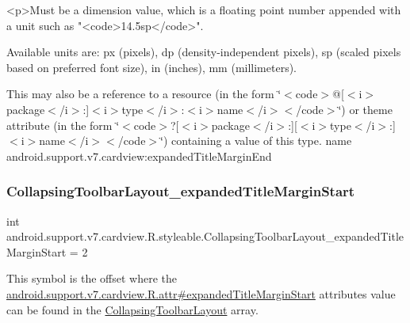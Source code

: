 \begin{DoxyVerb}      <p>Must be a dimension value, which is a floating point number appended with a unit such as "<code>14.5sp</code>".
\end{DoxyVerb}
 Available units are\+: px (pixels), dp (density-\/independent pixels), sp (scaled pixels based on preferred font size), in (inches), mm (millimeters). 

This may also be a reference to a resource (in the form \char`\"{}$<$code$>$@\mbox{[}$<$i$>$package$<$/i$>$\+:\mbox{]}$<$i$>$type$<$/i$>$\+:$<$i$>$name$<$/i$>$$<$/code$>$\char`\"{}) or theme attribute (in the form \char`\"{}$<$code$>$?\mbox{[}$<$i$>$package$<$/i$>$\+:\mbox{]}\mbox{[}$<$i$>$type$<$/i$>$\+:\mbox{]}$<$i$>$name$<$/i$>$$<$/code$>$\char`\"{}) containing a value of this type.  name android.\+support.\+v7.\+cardview\+:expanded\+Title\+Margin\+End \mbox{\label{classandroid_1_1support_1_1v7_1_1cardview_1_1R_1_1styleable_a9da9e2540ee41e2bf5cf6e02ca2d940f}} 
\subsubsection{\texorpdfstring{Collapsing\+Toolbar\+Layout\+\_\+expanded\+Title\+Margin\+Start}{CollapsingToolbarLayout\_expandedTitleMarginStart}}
{\footnotesize\ttfamily int android.\+support.\+v7.\+cardview.\+R.\+styleable.\+Collapsing\+Toolbar\+Layout\+\_\+expanded\+Title\+Margin\+Start = 2\hspace{0.3cm}{\ttfamily [static]}}

This symbol is the offset where the \hyperlink{classandroid_1_1support_1_1v7_1_1cardview_1_1R_1_1attr_a962000eea280327317fca819ae6f778a}{android.\+support.\+v7.\+cardview.\+R.\+attr\#expanded\+Title\+Margin\+Start} attribute\textquotesingle{}s value can be found in the \hyperlink{classandroid_1_1support_1_1v7_1_1cardview_1_1R_1_1styleable_a3b4c5393d0c99cb4e5a7a3911fc606b4}{Collapsing\+Toolbar\+Layout} array.

